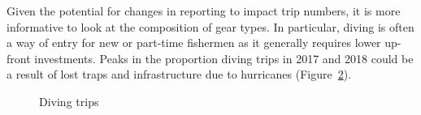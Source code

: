 \documentclass[
  letterpaper,
  oneside,
  open=any]{scrbook}
\begin{document}
\begin{figure}


\caption{\label{fig-gearSTX}}

\end{figure}%

Given the potential for changes in reporting to impact trip numbers, it
is more informative to look at the composition of gear types. In
particular, diving is often a way of entry for new or part-time
fishermen as it generally requires lower up-front investments. Peaks in
the proportion diving trips in 2017 and 2018 could be a result of lost
traps and infrastructure due to hurricanes (Figure~\ref{fig-dive}).

\begin{figure}


\caption{\label{fig-dive}Diving trips}

\end{figure}%
\end{document}

